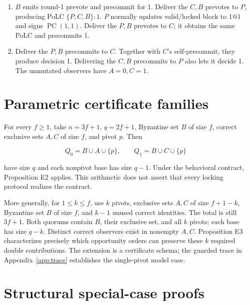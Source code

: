\begin{enumerate}
  valid round \(-1\). \(C\) and the unlocked \(P\) each sign
  \(\operatorname{PV}(1,1)\). Making \(P\) the proposer instead would
  require accounting for its cached valid block 0.
\item
  \(B\) emits round-1 prevote and precommit for 1. Deliver the \(C,B\)
  prevotes to \(P\), producing PoLC \(\{P,C,B\}:1\). \(P\) normally
  updates valid/locked block to \(1@1\) and signs
  \(\operatorname{PC}(1,1)\). Deliver the \(P,B\) prevotes to \(C\); it
  obtains the same PoLC and precommits 1.
\item
  Deliver the \(P,B\) precommits to \(C\). Together with \(C\)'s
  self-precommit, they produce decision 1. Delivering the \(C,B\)
  precommits to \(P\) also lets it decide 1. The unmutated observers
  have \(A=0,C=1\).
\end{enumerate}

\section{Parametric certificate
families}\label{parametric-certificate-families}

\label{app:families}

For every \(f\ge1\), take \(n=3f+1\), \(q=2f+1\), Byzantine set \(B\) of
size \(f\), correct exclusive sets \(A,C\) of size \(f\), and pivot
\(p\). Then

\[
Q_0=B\cup A\cup\{p\},\qquad Q_1=B\cup C\cup\{p\}
\]

have size \(q\) and each nonpivot base has size \(q-1\). Under the
behavioral contract, Proposition E2 applies. This arithmetic does not
assert that every locking protocol realizes the contract.

More generally, for \(1\le k\le f\), use \(k\) pivots, exclusive sets
\(A,C\) of size \(f+1-k\), Byzantine set \(B\) of size \(f\), and
\(k-1\) unused correct identities. The total is still \(3f+1\). Both
quorums contain \(B\), their exclusive set, and all \(k\) pivots; each
base has size \(q-k\). Distinct correct observers exist in nonempty
\(A,C\). Proposition E3 characterizes precisely which opportunity orders
can preserve these \(k\) required double contributions. The extension is
a certificate schema; the guarded trace in Appendix~\ref{app:trace}
establishes the single-pivot model case.

\section{Structural special-case
proofs}\label{structural-special-case-proofs}

